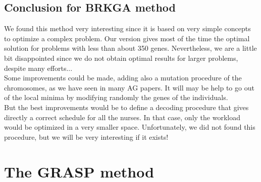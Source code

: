 \documentclass[11pt]{article}
\begin{document}
\subsection{Conclusion for BRKGA method}
We found this method very interesting since it is based on very simple concepts to optimize a complex problem. Our version gives most of the time the optimal solution for problems with less than about 350 genes. Nevertheless, we are a little bit disappointed since we do not obtain optimal results for larger problems, despite many efforts...  \\
Some improvements could be made, adding also a mutation procedure of the chromosomes, as we have seen in many AG papers. It will may be help to go out of the local minima by modifying  randomly the genes of the individuals. \\
But the best improvements would be to define a decoding procedure that gives directly a correct schedule for all the nurses. In that case, only the workload would be optimized in a very smaller space. Unfortunately, we did not found this procedure, but we will be very interesting if it exists!



\section{The GRASP method}


\end{document}
